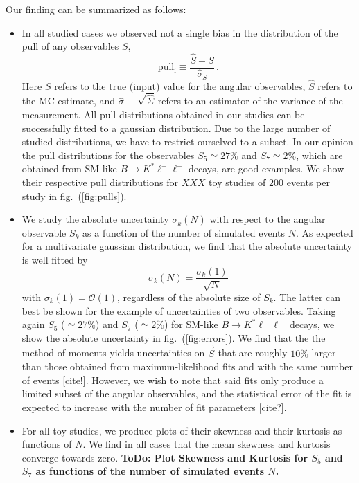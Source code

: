 \documentclass[aps,prd,reprint,nofootinbib,preprintnumbers]{revtex4}
\newcommand{\est}[1]{\widehat{#1}}
\newcommand{\order}[1]{\mathcal{O}\left({#1}\right)}
\newcommand{\reffig}[1]{fig.~(\ref{fig:#1})}
\newcommand{\todo}[1]{{\color{red}\bf ToDo: #1}}
\newcommand{\danny}[1]{{\color{purple}#1}}
\begin{document}
Our finding can be summarized as follows:
\begin{itemize}
    \item In all studied cases we observed not a single bias in the distribution of the $\mathrm{pull}$
        of any observables $S$,
        \begin{equation}
            \mathrm{pull_i} \equiv \frac{\est{S} - S}{\est{\sigma}_S}\,.
        \end{equation}
        Here $S$ refers to the true (input) value for the angular observables, $\est{S}$ refers to the
        MC estimate, and $\est{\sigma} \equiv \sqrt{\est{\Sigma}}$ refers to an estimator of the
        variance of the measurement. All pull distributions obtained in our studies can be successfully
        fitted to a gaussian distribution. Due to the large number of studied distributions, we have
        to restrict ourselved to a subset. In our opinion the pull distributions for the observables
        $S_5 \simeq 27\%$ and $S_7 \simeq 2\%$, which are obtained from SM-like $B\to K^*\ell^+\ell^-$
        decays, are good examples. We show their respective pull distributions for \danny{$XXX$} toy studies
        of $200$ events per study in \reffig{pulls}.
    \item We study the absolute uncertainty $\sigma_k(N)$ with respect to the angular observable $S_k$
        as a function of the number of simulated events $N$. As expected for a multivariate gaussian
        distribution, we find that the absolute uncertainty is well fitted by
        \begin{equation}
            \label{eq:unc-on-mean}
            \sigma_k(N) = \frac{\sigma_k(1)}{\sqrt{N}}
        \end{equation}
        with $\sigma_k(1) = \order{1}$, regardless of the absolute size of $S_k$. The latter can best be shown
        for the example of uncertainties of two observables. Taking again $S_5$ ($\simeq 27\%$) and $S_7$ ($\simeq 2\%$)
        for SM-like $B\to K^*\ell^+\ell^-$ decays, we show the absolute uncertainty in \reffig{errors}.
        We find that the the method of moments yields uncertainties on $\vec{S}$ that are roughly
        \danny{$10\%$} larger than those obtained from maximum-likelihood fits and with the same
        number of events \danny{[cite!]}. However, we wish to note that said fits only produce a limited
        subset of the angular observables, and the statistical error of the fit is expected to increase
        with the number of fit parameters \danny{[cite?]}.
    \item For all toy studies, we produce plots of their skewness and their kurtosis as functions of
        $N$. We find in all cases that the mean skewness and kurtosis converge towards zero.
        \todo{Plot Skewness and Kurtosis for $S_5$ and $S_7$ as functions of the number of simulated events $N$.}
\end{itemize}
\end{document}
